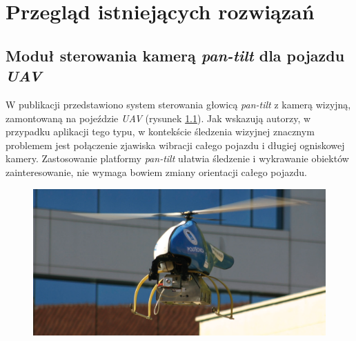 \chapter{Przegląd istniejących rozwiązań}
\label{cha:Przeglad_istniejacych_rozwiazan}

\section{Moduł sterowania kamerą \textit{pan-tilt} dla pojazdu \textit{UAV}}
\label{sec:Przyklad_Olivares-Mendez2009}

W publikacji \cite{Olivares-Mendez2009} przedstawiono system sterowania głowicą \textit{pan-tilt} z kamerą wizyjną, zamontowaną na pojeździe \textit{UAV} (rysunek \ref{fig:UAV_Olivares_Mendez}). Jak wskazują autorzy, w przypadku aplikacji tego typu, w kontekście śledzenia wizyjnej znacznym problemem jest połączenie zjawiska wibracji całego pojazdu i długiej ogniskowej kamery. Zastosowanie platformy \textit{pan-tilt} ułatwia śledzenie i wykrawanie obiektów zainteresowanie, nie wymaga bowiem zmiany orientacji całego pojazdu.
\begin{figure}[!htb]
	\begin{center}
		\includegraphics[width=12cm]{images/uav_olivares_mendez.png}
	\end{center}	
\label{fig:UAV_Olivares_Mendez}
\end{figure}

